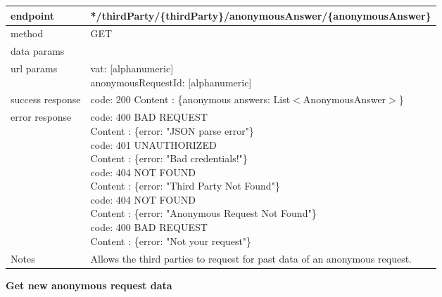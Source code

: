 	\begin{tabularx}{\linewidth}{| l| l }
		\hline
		endpoint & */thirdParty/\{thirdParty\}/anonymousAnswer/\{anonymousAnswer\} \\
		\hline
		method & GET \\
		\hline
		data params & \\
		\hline
		url params &
		\parbox{0.7\textwidth}{
			\bigskip
			vat: [alphanumeric]\\
			anonymousRequestId: [alphanumeric]
			\bigskip
		} \\
		\hline
		success response &
		\parbox{0.7\textwidth}{
			\bigskip
			code: 200\\
			Content : \{anonymous answers: List$<$AnonymousAnswer$>$\}
			\bigskip
		} \\
		\hline
		error response &
		\parbox{0.7\textwidth}{
			\bigskip
			code: 400 BAD REQUEST \\
			Content : \{error: "JSON parse error"\}\\
			code: 401 UNAUTHORIZED \\
			Content : \{error: "Bad credentials!"\}\\
			code: 404 NOT FOUND \\
			Content : \{error: "Third Party Not Found"\}\\
			code: 404 NOT FOUND \\
			Content : \{error: "Anonymous Request Not Found"\}\\
			code: 400 BAD REQUEST \\
			Content : \{error: "Not your request"\}\\
			\bigskip
		} \\
		\hline
		Notes & 
		\parbox{0.7\textwidth}{
			\bigskip Allows the third parties to request for past data of an anonymous request.
		\bigskip}  \\
		\hline
	\end{tabularx}
	
	\textbf{Get new anonymous request data} \\

